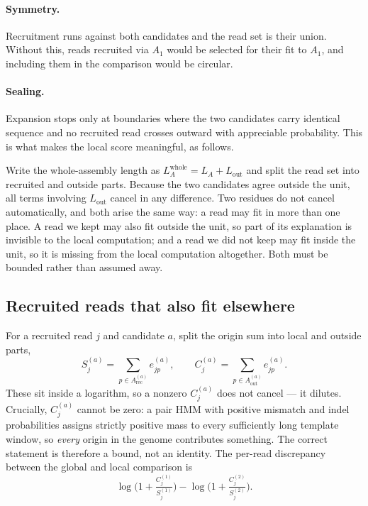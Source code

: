 \documentclass[11pt]{article}
\begin{document}
\paragraph{Symmetry.}  Recruitment runs against both candidates and the read set
is their union.  Without this, reads recruited via $A_1$ would be selected for
their fit to $A_1$, and including them in the comparison would be circular.

\paragraph{Sealing.}  Expansion stops only at boundaries where the two
candidates carry identical sequence and no recruited read crosses outward with
appreciable probability.  This is what makes the local score meaningful, as
follows.

Write the whole-assembly length as $L_A^{\text{whole}} = L_A + L_{\text{out}}$
and split the read set into recruited and outside parts.  Because the two
candidates agree outside the unit, all terms involving $L_{\text{out}}$ cancel
in any difference.  Two residues do not cancel automatically, and both arise
the same way: a read may fit in more than one place.  A read we kept may also
fit outside the unit, so part of its explanation is invisible to the local
computation; and a read we did not keep may fit inside the unit, so it is
missing from the local computation altogether.  Both must be bounded rather
than assumed away.

\subsection{Recruited reads that also fit elsewhere}

For a recruited read $j$ and candidate $a$, split the origin sum into local and
outside parts,
\begin{equation}
    S^{(a)}_j = \!\!\sum_{p\in A^{(a)}_{\text{rec}}}\!\! e^{(a)}_{jp},
    \qquad
    C^{(a)}_j = \!\!\sum_{p\in A^{(a)}_{\text{out}}}\!\! e^{(a)}_{jp} .
\end{equation}
These sit inside a logarithm, so a nonzero $C^{(a)}_j$ does not cancel --- it
dilutes.  Crucially, $C^{(a)}_j$ cannot be zero: a pair HMM with positive
mismatch and indel probabilities assigns strictly positive mass to every
sufficiently long template window, so \emph{every} origin in the genome
contributes something.  The correct statement is therefore a bound, not an
identity.  The per-read discrepancy between the global and local comparison is
\begin{equation}
    \log\!\Big(1+\tfrac{C^{(1)}_j}{S^{(1)}_j}\Big)
    - \log\!\Big(1+\tfrac{C^{(2)}_j}{S^{(2)}_j}\Big).
\label{eq:per-read-discrepancy}
\end{equation}
\end{document}
